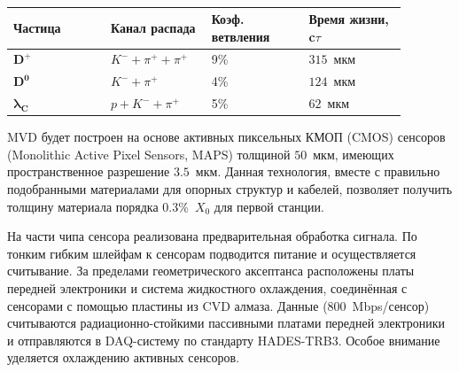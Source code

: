 \begin{table}[H]
\caption{}
\label{tabl:MVDphys}
\begin{tabular}{ | p{0.22\linewidth} | p{0.22\linewidth} | p{0.22\linewidth} | p{0.22\linewidth} | }
\hline
\textbf{Частица} & \textbf{Канал} \newline \textbf{распада} & \textbf{Коэф.} \newline \textbf{ветвления} & \textbf{Время жизни, c$\tau$} \\
\hline
$\mathbf{D^{+}}$ & $K^{-} + \pi^{+} + \pi^{+}$ & 9\% & $315$~мкм \\
\hline
$\mathbf{D^{0}}$ & $K^{-} + \pi^{+}$ & 4\% & $124$~мкм \\
\hline
$\mathbf{\lambda_{C}}$ & $p + K^{-} + \pi^{+}$ & 5\% & $62$~мкм \\
\hline
\end{tabular}
\end{table}

MVD будет построен на основе активных пиксельных КМОП (CMOS) сенсоров (Monolithic Active Pixel Sensors, MAPS) толщиной $50$~мкм, имеющих пространственное разрешение $3.5$~мкм. Данная технология, вместе с правильно подобранными материалами для опорных структур и кабелей, позволяет получить толщину материала порядка 0.3\%~$X_{0}$ для первой станции.




На части чипа сенсора реализована предварительная обработка сигнала.
По тонким гибким шлейфам к сенсорам подводится питание и осуществляется считывание.
За пределами геометрического аксептанса расположены платы передней электроники и система жидкостного охлаждения, соединённая с сенсорами с помощью пластины из CVD алмаза.
Данные (800~Mbps/сенсор) считываются радиационно-стойкими пассивными платами передней электроники и отправляются в DAQ-систему по стандарту HADES-TRB3.
Особое внимание уделяется охлаждению активных сенсоров.

